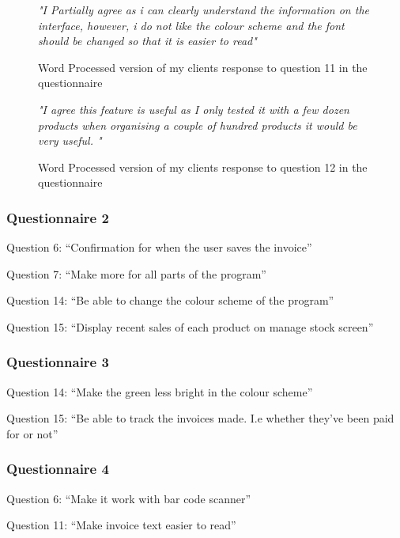 \begin{figure}[H]
\caption{Word Processed version of my clients response to question 11 in the questionnaire}
\vspace{3mm}
\textit{\large{"I Partially agree as i can clearly understand the information on the interface, however, i do not like the colour scheme and the font should be changed so that it is easier to read"}}
\end{figure}
\vspace{3mm}

\begin{figure}[H]
\caption{Word Processed version of my clients response to question 12 in the questionnaire} \label{client-evidence-Q3}
\vspace{3mm}
\textit{\large{"I agree this feature is useful as I only tested it with a few dozen products when organising a couple of hundred products it would be very useful. "}}
\vspace{3mm}
\end{figure}

\subsubsection{Questionnaire 2}

Question 6: ``Confirmation for when the user saves the invoice''

Question 7: ``Make more for all parts of the program''

Question 14: ``Be able to change the colour scheme of the program''

Question 15: ``Display recent sales of each product on manage stock screen''

\subsubsection{Questionnaire 3}

Question 14: ``Make the green less bright in the colour scheme''

Question 15: ``Be able to track the invoices made. I.e whether they've been paid for or not''

\subsubsection{Questionnaire 4}

Question 6: ``Make it work with bar code scanner''

Question 11: ``Make invoice text easier to read''

